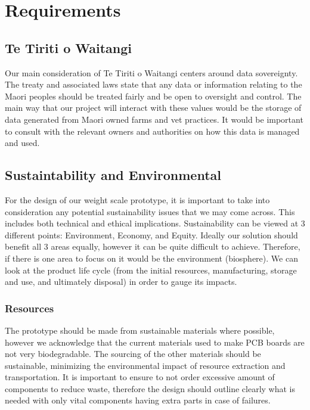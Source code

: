 \chapter{Requirements}


\section{Te Tiriti o Waitangi}

Our main consideration of Te Tiriti o Waitangi centers around data sovereignty. The treaty and associated laws state that any data or information relating to the Maori peoples should be treated fairly and be open to oversight and control. The main way that our project will interact with these values would be the storage of data generated from Maori owned farms and vet practices. It would be important to consult with the relevant owners and authorities on how this data is managed and used.

\section{Sustaintability and Environmental}

For the design of our weight scale prototype, it is important to take into consideration any potential sustainability issues that we may come across. This includes both technical and ethical implications. Sustainability can be viewed at 3 different points: Environment, Economy, and Equity. Ideally our solution should benefit all 3 areas equally, however it can be quite difficult to achieve. Therefore, if there is one area to focus on it would be the environment (biosphere). We can look at the product life cycle (from the initial resources, manufacturing, storage and use, and ultimately disposal) in order to gauge its impacts.

\subsection{Resources}

The prototype should be made from sustainable materials where possible, however we acknowledge that the current materials used to make PCB boards are not very biodegradable. The sourcing of the other materials should be sustainable, minimizing the environmental impact of resource extraction and transportation. It is important to ensure to not order excessive amount of components to reduce waste, therefore the design should outline clearly what is needed with only vital components having extra parts in case of failures.

